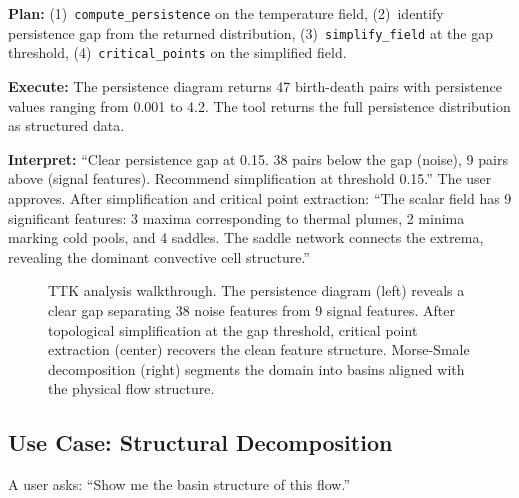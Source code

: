 \documentclass{vgtc}                          %
\begin{document}
\textbf{Plan:} (1)~\texttt{compute\_persistence} on the temperature field,
(2)~identify persistence gap from the returned distribution,
(3)~\texttt{simplify\_field} at the gap threshold,
(4)~\texttt{critical\_points} on the simplified field.

\textbf{Execute:} The persistence diagram returns 47 birth-death pairs with
persistence values ranging from 0.001 to 4.2.
The tool returns the full persistence distribution as structured data.

\textbf{Interpret:} ``Clear persistence gap at 0.15.
38 pairs below the gap (noise), 9 pairs above (signal features).
Recommend simplification at threshold 0.15.''
The user approves.
After simplification and critical point extraction: ``The scalar field has 9
significant features: 3 maxima corresponding to thermal plumes, 2 minima
marking cold pools, and 4 saddles.
The saddle network connects the extrema, revealing the dominant convective
cell structure.''

\begin{figure}[tb]
 \centering
 \caption{TTK analysis walkthrough. The persistence diagram (left) reveals a
 clear gap separating 38 noise features from 9 signal features. After
 topological simplification at the gap threshold, critical point extraction
 (center) recovers the clean feature structure. Morse-Smale decomposition
 (right) segments the domain into basins aligned with the physical flow
 structure.}
 \label{fig:usecase_ttk}
\end{figure}

\subsection{Use Case: Structural Decomposition}

A user asks: ``Show me the basin structure of this flow.''
\end{document}
